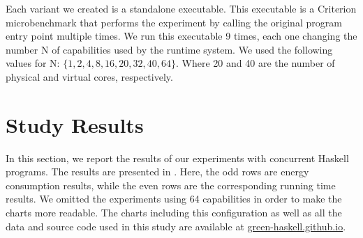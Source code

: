 Each variant we created is a standalone executable. This executable is a Criterion microbenchmark that performs the experiment by calling the original program entry point multiple times. We run this executable 9 times, each one changing the number N of capabilities used by the runtime system. We used the following values for N: $\{1, 2, 4, 8, 16, 20, 32, 40, 64\}$. Where 20 and 40 are the number of physical and virtual cores, respectively.


\section{Study Results}\label{sec:results}
In this section, we report the results of our experiments with concurrent Haskell programs. The results are presented in . Here, the odd rows are energy consumption results, while the even rows are the corresponding running time results. We omitted the experiments using 64 capabilities in order to make the charts more readable. The charts including this configuration as well as all the data and source code used in this study are available at \href{http://green-haskell.github.io/}{green-haskell.github.io}.
\newline

